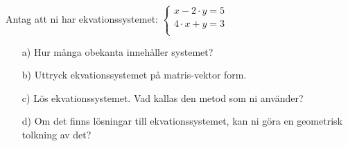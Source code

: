 Antag att ni har ekvationssystemet:
\begin{math}
	\begin{cases}
	x - 2 \cdot y = 5 \\
	4 \cdot x + y = 3 \\
	\end{cases}
\end{math}

\begin{itemize}
\item[a) ] Hur många obekanta innehåller systemet?
\item[b) ] Uttryck ekvationssystemet på matris-vektor form.
\item[c) ] Lös ekvationssystemet. Vad kallas den metod som ni använder?
\item[d) ] Om det finns lösningar till ekvationssystemet, kan ni göra en geometrisk tolkning av det?
\end{itemize}